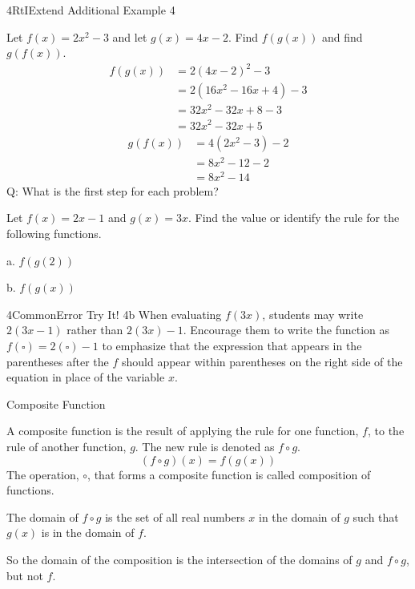 \documentclass{article}
\newenvironment{concept-box}{}{}        %
\newenvironment{tryit}[1]{}{}           %
\newenvironment{te-addendum}[2]{}{}     %
\newcommand{\answer}[1]{}               %
\begin{document}
\begin{te-addendum}{4}{RtIExtend}
Additional Example 4

Let \(f(x)=2x^2-3\) and let \(g(x)=4x-2\). Find \(f(g(x))\) and find \(g(f(x))\).
\[
\begin{aligned}
f(g(x))&=2(4x-2)^2-3\\
&=2(16x^2-16x+4)-3\\
&=32x^2-32x+8-3\\
&=32x^2-32x+5
\end{aligned}
\]
\[
\begin{aligned}
g(f(x))&=4(2x^2-3)-2\\
&=8x^2-12-2\\
&=8x^2-14
\end{aligned}
\]
Q: What is the first step for each problem?
\answer{Replace the expression inside the outer parentheses.}
\end{te-addendum}

\begin{tryit}{4}
Let \(f(x)=2x-1\) and \(g(x)=3x\). Find the value or identify the rule for the following functions.

a. \(f(g(2))\)

b. \(f(g(x))\)

\answer{a. \(f(g(2))=11\). b. \(f(g(x))=6x-1\).}
\end{tryit}

\begin{te-addendum}{4}{CommonError}
Try It! 4b When evaluating \(f(3x)\), students may write \(2(3x-1)\) rather than \(2(3x)-1\). Encourage them to write the function as \(f(\square)=2(\square)-1\) to emphasize that the expression that appears in the parentheses after the \(f\) should appear within parentheses on the right side of the equation in place of the variable \(x\).
\end{te-addendum}

\begin{concept-box}
Composite Function

A composite function is the result of applying the rule for one function, \(f\), to the rule of another function, \(g\). The new rule is denoted as \(f\circ g\).
\[
(f\circ g)(x)=f(g(x))
\]
The operation, \(\circ\), that forms a composite function is called composition of functions.

The domain of \(f\circ g\) is the set of all real numbers \(x\) in the domain of \(g\) such that \(g(x)\) is in the domain of \(f\).

So the domain of the composition is the intersection of the domains of \(g\) and \(f\circ g\), but not \(f\).
\end{concept-box}
\end{document}
